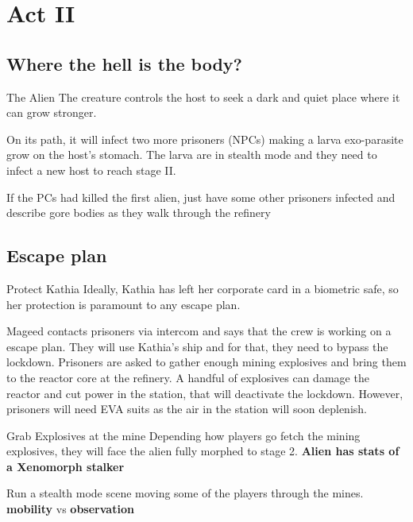 \chapter{Act II}




\section{Where the hell is the body?}


\begin{rpg-commentbox}{The Alien}
   The creature controls the host to seek a dark and quiet place where it can grow stronger.

    On its path, it will infect two more prisoners (NPCs) making a larva exo-parasite grow on the host's stomach. 
    The larva are in stealth mode and they need to infect a new host to reach stage II.

    \medskip

    If the PCs had killed the first alien, just have some other prisoners infected and describe gore bodies as they walk through the refinery
\end{rpg-commentbox}


\newsect

\section{Escape plan}


\begin{rpg-commentbox}{Protect Kathia}
    Ideally, Kathia has left her corporate card in a biometric safe, so her protection is paramount to any escape plan.

    Mageed contacts prisoners via intercom and says that the crew is working on a escape plan. They will use Kathia's ship and for that, they need to bypass the lockdown.
    Prisoners are asked to gather enough mining explosives and bring them to the reactor core at the refinery. A handful of explosives can damage the reactor and cut power in the station, that will deactivate the lockdown. However, prisoners will need EVA suits as the air in the station will soon deplenish.
 \end{rpg-commentbox}


 \begin{rpg-commentbox}{Grab Explosives at the mine}
    Depending how players go fetch the mining explosives, they will face the alien fully morphed to stage 2. \textbf{Alien has stats of a Xenomorph stalker}

    Run a stealth mode scene moving some of the players through the mines. \textbf{mobility} vs \textbf{observation}
 \end{rpg-commentbox}


